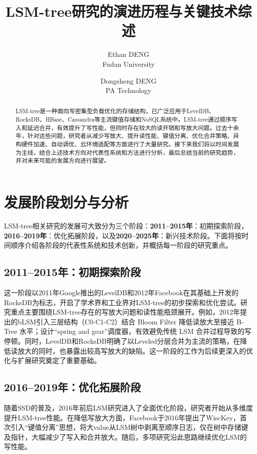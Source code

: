 \documentclass[lang=cn,11pt,a4paper]{elegantpaper}
\title{LSM-tree研究的演进历程与关键技术综述}
\author{Ethan DENG \\ Fudan University \and Dongsheng DENG \\ PA Technology}
\date{\zhtoday}
\begin{document}
\maketitle

\begin{abstract}
LSM-tree是一种面向写密集型负载优化的存储结构，已广泛应用于LevelDB、RocksDB、HBase、Cassandra等主流键值存储和NoSQL系统中。LSM-tree通过顺序写入和延迟合并，有效提升了写性能，但同时存在较大的读开销和写放大问题。过去十余年，针对这些问题，研究者从减少写放大、提升读性能、键值分离、优化合并策略、异构硬件加速、自动调优、云环境适配等方面进行了大量研究。接下来我们将以时间发展为主线，结合上述技术方向对代表性系统和方法进行分析，最后总结当前的研究趋势，并对未来可能的发展方向进行展望。
\end{abstract}


\section{发展阶段划分与分析}

LSM-tree相关研究的发展可大致分为三个阶段：\textbf{2011–2015年}：初期探索阶段，\textbf{2016–2019年}：优化拓展阶段，以及\textbf{2020–2025年}：新兴技术阶段。下面将按时间顺序介绍各阶段的代表性系统和技术创新，并概括每一阶段的研究重点。

\subsection{2011–2015年：初期探索阶段}

这一阶段以2011年Google推出的LevelDB和2012年Facebook在其基础上开发的RocksDB为标志，开启了学术界和工业界对LSM-tree的初步探索和优化尝试。研究重点主要围绕LSM-tree存在的写放大问题和读性能瓶颈展开。例如，2012年提出的bLSM引入三层结构（C0-C1-C2）结合 Bloom Filter 降低读放大至接近 B-Tree 水平；设计“spring and gear”调度器，有效避免传统 LSM 合并过程导致的写停顿。同时，LevelDB和RocksDB明确了以Leveled分层合并为主流的策略，在降低读放大的同时，也暴露出较高写放大的缺陷。这一阶段的工作为后续更深入的优化与扩展研究奠定了重要基础。

\subsection{2016–2019年：优化拓展阶段}

随着SSD的普及，2016年前后LSM研究进入了全面优化阶段，研究者开始从多维度提升LSM-tree性能。在降低写放大方面，Facebook于2016年提出了WiscKey，首次引入“键值分离”思想，将大value从LSM树中剥离至顺序日志，仅在树中存储键及指针，大幅减少了写入和合并放大。随后，多项研究沿此思路继续优化LSM的写性能。
\end{document}
